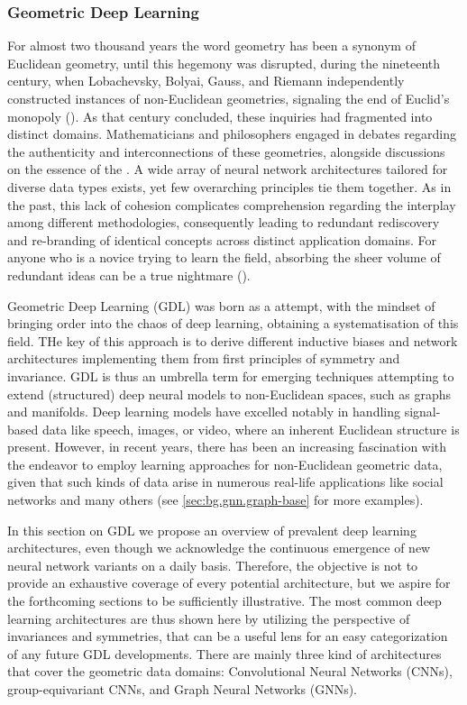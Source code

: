 \documentclass[binding=0.6cm]{sapthesis}
\newcommand{\mycite}[1]{(\cite{#1})}
\begin{document}
\subsubsection{Geometric Deep Learning}
\label{sec:bg.gnn.geo-deep-learning}
For almost two thousand years the word geometry has been a synonym of Euclidean geometry, until this hegemony was disrupted, during the nineteenth century, when Lobachevsky, Bolyai, Gauss, and Riemann independently constructed instances of non-Euclidean geometries, signaling the end of Euclid's monopoly \mycite{coxeter1998-non-euclidean-geom}. As that century concluded, these inquiries had fragmented into distinct domains. Mathematicians and philosophers engaged in debates regarding the authenticity and interconnections of these geometries, alongside discussions on the essence of the . A wide array of neural network architectures tailored for diverse data types exists, yet few overarching principles tie them together. As in the past, this lack of cohesion complicates comprehension regarding the interplay among different methodologies, consequently leading to redundant rediscovery and re-branding of identical concepts across distinct application domains. For anyone who is a novice trying to learn the field, absorbing the sheer volume of redundant ideas can be a true nightmare \mycite{bronstein2021geometric}.

Geometric Deep Learning (GDL) was born as a  attempt, with the mindset of bringing order into the chaos of deep learning, obtaining a systematisation of this field. THe key of this approach is to derive different inductive biases and network architectures implementing them from first principles of symmetry and invariance. GDL is thus an umbrella term for emerging techniques attempting to extend (structured) deep neural models to non-Euclidean spaces, such as graphs and manifolds. Deep learning models have excelled notably in handling signal-based data like speech, images, or video, where an inherent Euclidean structure is present. However, in recent years, there has been an increasing fascination with the endeavor to employ learning approaches for non-Euclidean geometric data, given that such kinds of data arise in numerous real-life applications like social networks and many others (see \cref{sec:bg.gnn.graph-base} for more examples).

In this section on GDL we propose an overview of prevalent deep learning architectures, even though we acknowledge the continuous emergence of new neural network variants on a daily basis. Therefore, the objective is not to provide an exhaustive coverage of every potential architecture, but we aspire for the forthcoming sections to be sufficiently illustrative. The most common deep learning architectures are thus shown here by utilizing the perspective of invariances and symmetries, that can be a useful lens for an easy categorization of any future GDL developments. There are mainly three kind of architectures that cover the geometric data domains: Convolutional Neural Networks (CNNs), group-equivariant CNNs, and Graph Neural Networks (GNNs). 
\end{document}
